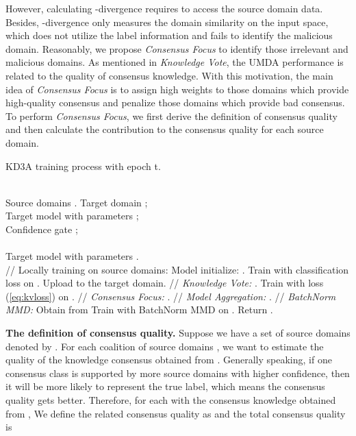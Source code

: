 \documentclass{article}
\begin{document}
However, calculating -divergence requires to access the source domain data. Besides, -divergence only measures the domain similarity on the input space, which does not utilize the label information and fails to identify the malicious domain. Reasonably, we propose \textit{Consensus Focus} to identify those irrelevant and malicious domains. As mentioned in \textit{Knowledge Vote}, the UMDA performance is related to the quality of consensus knowledge. With this motivation, the main idea of \textit{Consensus Focus} is to assign high weights to those domains which provide high-quality consensus and penalize those domains which provide bad consensus. To perform \textit{Consensus Focus}, we first derive the definition of consensus quality and then calculate the contribution to the consensus quality for each source domain.\\
\begin{algorithm}[t] 
\caption{KD3A training process with epoch t.} 
\label{alg:KD3A} 
\begin{algorithmic}[1] 
\REQUIRE ~~\\ Source domains . Target domain ;\\
Target model  with parameters ;\\
Confidence gate ;\\
\ENSURE ~~\\ Target model  with parameters .\\
\STATE // Locally training on source domains:
    \STATE Model initialize: .
    \STATE Train  with classification loss on .
\ENDFOR
\STATE Upload  to the target domain.
\STATE // \textit{Knowledge Vote:}
\STATE .
\STATE Train  with  loss (\ref{eq:kvloss}) on .
\STATE // \textit{Consensus Focus:}
\STATE .
\STATE // \textit{Model Aggregation:}
\STATE .
\STATE // \textit{BatchNorm MMD:}
\STATE Obtain  from 
\STATE Train  with BatchNorm MMD on .
\STATE Return .
\end{algorithmic}
\end{algorithm}
\textbf{The definition of consensus quality.} Suppose we have a set of source domains denoted by . For each coalition of source domains , we want to estimate the quality of the knowledge consensus obtained from . Generally speaking, if one consensus class is supported by more source domains with higher confidence, then it will be more likely to represent the true label, which means the consensus quality gets better. Therefore, for each  with the consensus knowledge  obtained from , We define the related consensus quality as  and the total consensus quality  is
\end{document}
